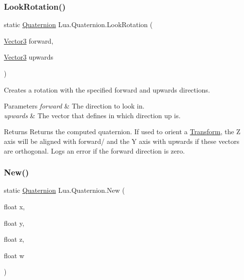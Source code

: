 \subsubsection{\texorpdfstring{LookRotation()}{LookRotation()}\hspace{0.1cm}{\footnotesize\ttfamily [2/2]}}
{\footnotesize\ttfamily static \mbox{\hyperlink{class_lua_1_1_quaternion}{Quaternion}} Lua.\+Quaternion.\+Look\+Rotation (\begin{DoxyParamCaption}\item[{\mbox{\hyperlink{class_lua_1_1_vector3}{Vector3}}}]{forward,  }\item[{\mbox{\hyperlink{class_lua_1_1_vector3}{Vector3}}}]{upwards }\end{DoxyParamCaption})\hspace{0.3cm}{\ttfamily [static]}}



Creates a rotation with the specified forward and upwards directions. 


\begin{DoxyParams}{Parameters}
{\em forward} & The direction to look in.\\
\hline
{\em upwards} & The vector that defines in which direction up is.\\
\hline
\end{DoxyParams}
\begin{DoxyReturn}{Returns}
Returns the computed quaternion. If used to orient a \mbox{\hyperlink{class_lua_1_1_transform}{Transform}}, the Z axis will be aligned with forward/ and the Y axis with upwards if these vectors are orthogonal. Logs an error if the forward direction is zero.
\end{DoxyReturn}
\mbox{\label{class_lua_1_1_quaternion_a39cfba79d11687138569de7edd9e2727}} 
\subsubsection{\texorpdfstring{New()}{New()}}
{\footnotesize\ttfamily static \mbox{\hyperlink{class_lua_1_1_quaternion}{Quaternion}} Lua.\+Quaternion.\+New (\begin{DoxyParamCaption}\item[{float}]{x,  }\item[{float}]{y,  }\item[{float}]{z,  }\item[{float}]{w }\end{DoxyParamCaption})\hspace{0.3cm}{\ttfamily [static]}}



